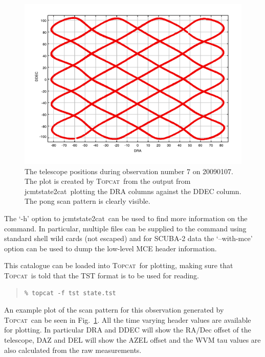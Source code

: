\documentclass[twoside,11pt]{article}
\newcommand{\xref}[3]{#1}
\renewcommand{\_}{\texttt{\symbol{95}}}
\newenvironment{myquote}{\begin{quote}\begin{small}}{\end{small}\end{quote}}
\newcommand{\topcat}{\xref{\textsc{Topcat}}{sun253}{}}
\newcommand{\task}[1]{\textsf{#1}}
\newcommand{\jcmtstate}{\xref{\task{jcmtstate2cat}}{sun258}{JCMTSTATE2CAT}}
\begin{document}
\begin{figure}
\begin{center}
\includegraphics{sc19_scan_pattern}
\caption{The telescope positions during observation number 7 on
  20090107. The plot is created by \topcat\ from the output from
\jcmtstate\ plotting the DRA columns against the DDEC column. The pong
scan pattern is clearly visible.}
\label{fig:topcat}
\end{center}
\end{figure}

The `-h' option to \jcmtstate\ can be used to find more information on
the command. In particular, multiple files can be supplied to the
command using standard shell wild cards (not escaped) and for SCUBA-2
data the `--with-mce' option can be used to dump the low-level MCE
header information.

This catalogue can be loaded into \topcat\ for plotting, making sure
that \topcat\ is told that the TST format is to be used for reading.

\begin{myquote}
\begin{verbatim}
% topcat -f tst state.tst
\end{verbatim}
\end{myquote}

An example plot of the scan pattern for this observation generated by
\topcat\ can be seen in Fig.~\ref{fig:topcat}. All the time varying
header values are available for plotting. In particular DRA and DDEC
will show the RA/Dec offset of the telescope, DAZ and DEL will show
the AZEL offset and the WVM tau values are also calculated from the
raw measurements.
\end{document}
